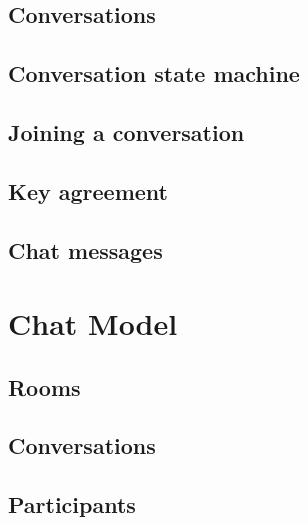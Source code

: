 \documentclass{article}
\begin{document}

\subsection{Conversations}


\subsection{Conversation state machine}


\subsection{Joining a conversation}


\subsection{Key agreement}


\subsection{Chat messages}



\section{Chat Model}
\label{sec:chat-model}


\subsection{Rooms}


\subsection{Conversations}


\subsection{Participants}
\end{document}
